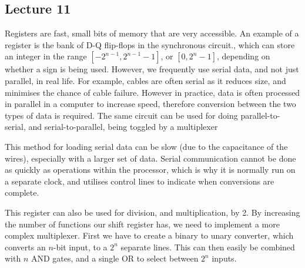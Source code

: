 \documentclass[a4paper, 12pt]{article}
\begin{document}
        \subsection*{Lecture 11}
            Registers are fast, small bits of memory that are very accessible. An example of a register is the bank of D-Q flip-flops in the synchronous circuit., which can store an integer in the range $[-2^{n - 1}, 2^{n - 1} - 1]$, or $[0, 2^n - 1]$, depending on whether a sign is being used. However, we frequently use serial data, and not just parallel, in real life. For example, cables are often serial as it reduces size, and minimises the chance of cable failure. However in practice, data is often processed in parallel in a computer to increase speed, therefore conversion between the two types of data is required. The same circuit can be used for doing parallel-to-serial, and serial-to-parallel, being toggled by a multiplexer
            \medskip

            This method for loading serial data can be slow (due to the capacitance of the wires), especially with a larger set of data. Serial communication cannot be done as quickly as operations within the processor, which is why it is normally run on a separate clock, and utilises control lines to indicate when conversions are complete.
            \medskip

            This register can also be used for division, and multiplication, by 2. By increasing the number of functions our shift register has, we need to implement a more complex multiplexer. First we have to create a binary to unary converter, which converts an $n$-bit input, to a $2^n$ separate lines. This can then easily be combined with $n$ AND gates, and a single OR to select between $2^n$ inputs.
            \medskip
\end{document}
